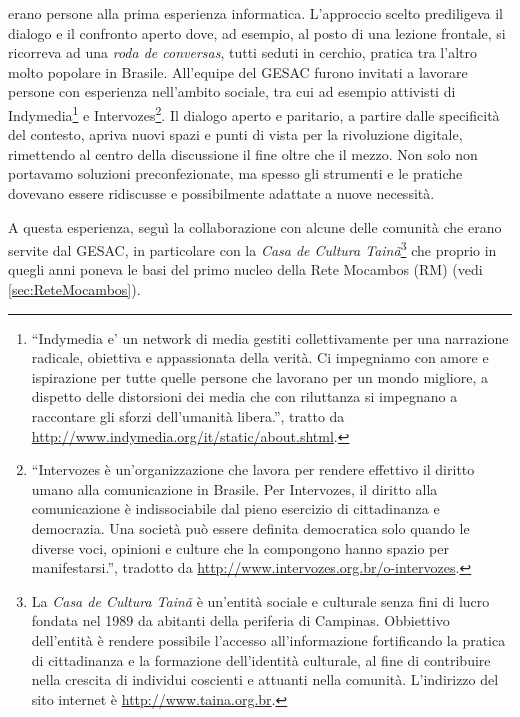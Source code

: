 erano persone alla prima esperienza informatica. L'approccio scelto
prediligeva il dialogo e il confronto aperto dove, ad esempio, al
posto di una lezione frontale, si ricorreva ad una \emph{roda de
  conversas}, tutti seduti in cerchio, pratica tra l'altro molto
popolare in Brasile. All'equipe del GESAC furono invitati a lavorare
persone con esperienza nell'ambito sociale, tra cui ad esempio
attivisti di Indymedia\footnote{``Indymedia e' un network di media
  gestiti collettivamente per una narrazione radicale, obiettiva e
  appassionata della verità. Ci impegniamo con amore e ispirazione per
  tutte quelle persone che lavorano per un mondo migliore, a dispetto
  delle distorsioni dei media che con riluttanza si impegnano a
  raccontare gli sforzi dell'umanità libera.'', tratto da
  \url{http://www.indymedia.org/it/static/about.shtml}.} e
Intervozes\footnote{``Intervozes è un'organizzazione che lavora per
  rendere effettivo il diritto umano alla comunicazione in Brasile.
  Per Intervozes, il diritto alla comunicazione è indissociabile dal
  pieno esercizio di cittadinanza e democrazia. Una società può essere
  definita democratica solo quando le diverse voci, opinioni e culture
  che la compongono hanno spazio per manifestarsi.'', tradotto da
  \url{http://www.intervozes.org.br/o-intervozes}.}. Il dialogo aperto
e paritario, a partire dalle specificità del contesto, apriva nuovi
spazi e punti di vista per la rivoluzione digitale, rimettendo al
centro della discussione il fine oltre che il mezzo. Non solo non
portavamo soluzioni preconfezionate, ma spesso gli strumenti e le
pratiche dovevano essere ridiscusse e possibilmente adattate a nuove
necessità.

A questa esperienza, seguì la collaborazione con alcune delle comunità
che erano servite dal GESAC, in particolare con la \emph{Casa de
  Cultura Tainã}\footnote{La \emph{Casa de Cultura Tainã} è un'entità
  sociale e culturale senza fini di lucro fondata nel 1989 da abitanti
  della periferia di Campinas. Obbiettivo dell'entità è rendere
  possibile l'accesso all'informazione fortificando la pratica di
  cittadinanza e la formazione dell'identità culturale, al fine di
  contribuire nella crescita di individui coscienti e attuanti nella
  comunità. L'indirizzo del sito internet è
  \url{http://www.taina.org.br}.} che proprio in quegli anni poneva le
basi del primo nucleo della Rete Mocambos (RM) (vedi
\ref{sec:ReteMocambos}). 

